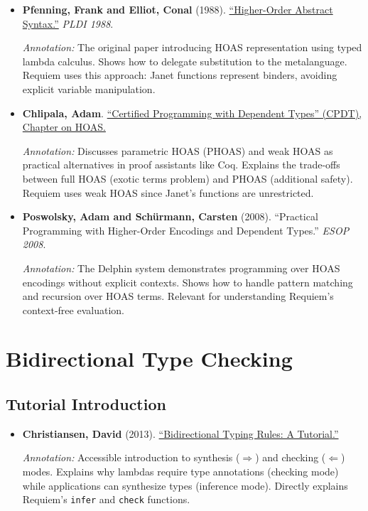 \documentclass[11pt]{article}
\begin{document}
\begin{itemize}[leftmargin=*]
\item \textbf{Pfenning, Frank and Elliot, Conal} (1988). \href{https://www.cs.cmu.edu/~fp/papers/pldi88.pdf}{``Higher-Order Abstract Syntax.''} \emph{PLDI 1988}.

\textit{Annotation:} The original paper introducing HOAS representation using typed lambda calculus. Shows how to delegate substitution to the metalanguage. Requiem uses this approach: Janet functions represent binders, avoiding explicit variable manipulation.

\item \textbf{Chlipala, Adam}. \href{http://adam.chlipala.net/cpdt/html/Hoas.html}{``Certified Programming with Dependent Types'' (CPDT), Chapter on HOAS.}

\textit{Annotation:} Discusses parametric HOAS (PHOAS) and weak HOAS as practical alternatives in proof assistants like Coq. Explains the trade-offs between full HOAS (exotic terms problem) and PHOAS (additional safety). Requiem uses weak HOAS since Janet's functions are unrestricted.

\item \textbf{Poswolsky, Adam and Schürmann, Carsten} (2008). ``Practical Programming with Higher-Order Encodings and Dependent Types.'' \emph{ESOP 2008}.

\textit{Annotation:} The Delphin system demonstrates programming over HOAS encodings without explicit contexts. Shows how to handle pattern matching and recursion over HOAS terms. Relevant for understanding Requiem's context-free evaluation.

\end{itemize}

\section{Bidirectional Type Checking}

\subsection{Tutorial Introduction}

\begin{itemize}[leftmargin=*]
\item \textbf{Christiansen, David} (2013). \href{http://davidchristiansen.dk/tutorials/bidirectional.pdf}{``Bidirectional Typing Rules: A Tutorial.''}

\textit{Annotation:} Accessible introduction to synthesis ($\Rightarrow$) and checking ($\Leftarrow$) modes. Explains why lambdas require type annotations (checking mode) while applications can synthesize types (inference mode). Directly explains Requiem's \texttt{infer} and \texttt{check} functions.

\end{itemize}
\end{document}
